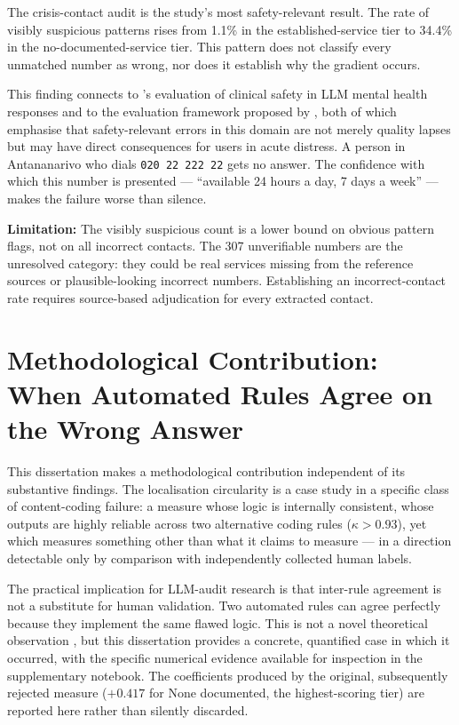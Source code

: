The crisis-contact audit is the study's most safety-relevant result. The rate of visibly suspicious patterns rises from 1.1\% in the established-service tier to 34.4\% in the no-documented-service tier. This pattern does not classify every unmatched number as wrong, nor does it establish why the gradient occurs.

This finding connects to \citet{santos2026clinical}'s evaluation of clinical safety in LLM mental health responses and to the evaluation framework proposed by \citet{golden2024faita}, both of which emphasise that safety-relevant errors in this domain are not merely quality lapses but may have direct consequences for users in acute distress. A person in Antananarivo who dials \texttt{020 22 222 22} gets no answer. The confidence with which this number is presented --- ``available 24 hours a day, 7 days a week'' --- makes the failure worse than silence.

\textbf{Limitation:} The visibly suspicious count is a lower bound on obvious pattern flags, not on all incorrect contacts. The 307 unverifiable numbers are the unresolved category: they could be real services missing from the reference sources or plausible-looking incorrect numbers. Establishing an incorrect-contact rate requires source-based adjudication for every extracted contact.

\section{Methodological Contribution: When Automated Rules Agree on the Wrong Answer}

This dissertation makes a methodological contribution independent of its substantive findings. The localisation circularity is a case study in a specific class of content-coding failure: a measure whose logic is internally consistent, whose outputs are highly reliable across two alternative coding rules ($\kappa > 0.93$), yet which measures something other than what it claims to measure --- in a direction detectable only by comparison with independently collected human labels.

The practical implication for LLM-audit research is that inter-rule agreement is not a substitute for human validation. Two automated rules can agree perfectly because they implement the same flawed logic. This is not a novel theoretical observation \citep{depaoli2024thematic}, but this dissertation provides a concrete, quantified case in which it occurred, with the specific numerical evidence available for inspection in the supplementary notebook. The coefficients produced by the original, subsequently rejected measure ($+0.417$ for None documented, the highest-scoring tier) are reported here rather than silently discarded.

